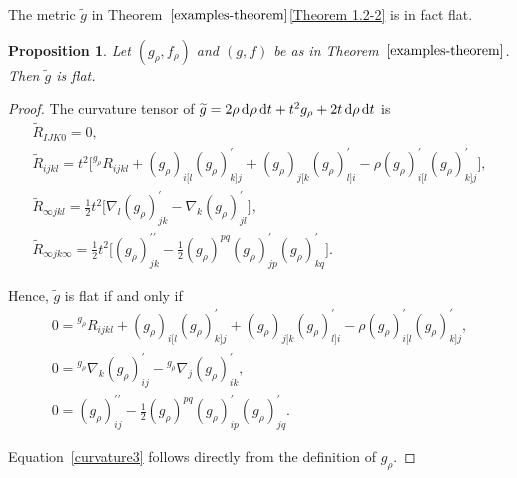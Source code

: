 \documentclass[10pt,a4paper]{amsart}
\numberwithin{equation}{section}
\newtheorem{Proposition}[Theorem]{Proposition}
 { \theoremstyle{definition}
\newtheorem{Definition}[Theorem]{Definition}
\newtheorem{Note}[Theorem]{Note}
\newtheorem{Example}[Theorem]{Example}
\newtheorem{Remark}[Theorem]{Remark} }
\begin{document}
The metric $\widetilde{g}$ in Theorem~$\ref{examples-theorem}$\ref{Theorem 1.2-2} is in fact flat.
\begin{Proposition}
\label{conformally-flat-theorem}
Let $(g_\rho,f_\rho)$ and $(g,f)$ be as in Theorem~$\ref{examples-theorem}$. Then $\widetilde{g}$ is flat.
\end{Proposition}

\begin{proof}
The curvature tensor of $\widetilde{g}=2\rho\,\mathrm{d}\rho\, \mathrm{d}t+t^2 g_\rho+2t\,{\rm d}\rho\, \mathrm{d}t$ is \cite[equation (6.1)]{FeffermanGraham2012}
\begin{gather*}
\widetilde{R}_{IJK0} = 0,
\\
\widetilde{R}_{i j k l} =t^{2}\bigl[{}^{g_\rho}R_{i j k l}+(g_\rho)_{i[l} (g_\rho)_{k] j}^{\prime}+(g_\rho)_{j[k} (g_\rho)_{l] i}^{\prime}-\rho (g_\rho)_{i[l}^{\prime} (g_\rho)_{k] j}^{\prime}\bigr],
\\
\widetilde{R}_{\infty j k l} =\frac{1}{2} t^{2}\bigl[\nabla_{l} (g_\rho)_{j k}^{\prime}-\nabla_{k} (g_\rho)_{j l}^{\prime}\bigr],
\\
\widetilde{R}_{\infty j k \infty} =\frac{1}{2} t^{2}\biggl[(g_\rho)_{j k}^{\prime \prime}-\frac{1}{2} (g_\rho)^{p q} (g_\rho)_{j p}^{\prime} (g_\rho)_{k q}^{\prime}\biggr].
\end{gather*}

Hence, $\widetilde{g}$ is flat if and only if
\begin{subequations}
\begin{gather}
0={ }^{g_\rho} R_{i j k l}+(g_\rho)_{i[l} (g_\rho)_{k] j}^{\prime}+(g_\rho)_{j[k} (g_\rho)_{l] i}^{\prime}-\rho (g_\rho)_{i[l}^{\prime} (g_\rho)_{k] j}^{\prime},
\label{curvature1}
\\
\label{curvature2}
0={ }^{g_\rho} \nabla_{k} (g_\rho)_{i j}^{\prime}-{ }^{g_\rho} \nabla_{j} (g_\rho)_{i k}^{\prime},
\\
\label{curvature3}
0=(g_\rho)_{i j}^{\prime \prime}-\frac{1}{2} (g_\rho)^{p q} (g_\rho)_{i p}^{\prime} (g_\rho)_{j q}^{\prime}.
\end{gather}
\end{subequations}

Equation~\eqref{curvature3} follows directly from the definition of $g_\rho$.



\end{proof}
\end{document}
